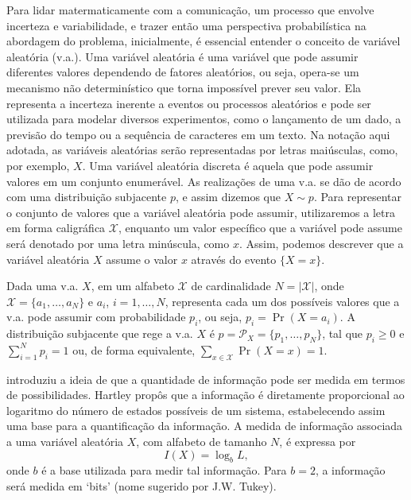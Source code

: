 Para lidar matermaticamente com a comunicação, um processo que envolve
incerteza e variabilidade, e trazer então uma perspectiva probabilística na
abordagem do problema, inicialmente, é essencial entender o conceito de
variável aleatória (v.a.). Uma variável aleatória é uma variável que pode
assumir diferentes valores dependendo de fatores aleatórios, ou seja, opera-se
um mecanismo não determinístico que torna impossível prever seu valor. Ela
representa a incerteza inerente a eventos ou processos aleatórios e pode ser
utilizada para modelar diversos experimentos, como o lançamento de um dado, a
previsão do tempo ou a sequência de caracteres em um texto. Na notação aqui
adotada, as variáveis aleatórias serão representadas por letras maiúsculas,
como, por exemplo, $X$. Uma variável aleatória discreta é aquela que pode
assumir valores em um conjunto enumerável. As realizações de uma v.a. se dão de
acordo com uma distribuição subjacente $p$, e assim dizemos que $X \sim p$.
Para representar o conjunto de valores que a variável aleatória pode assumir,
utilizaremos a letra em forma caligráfica $\mathcal{X}$, enquanto um valor
específico que a variável pode assume será denotado por uma letra minúscula,
como $x$. Assim, podemos descrever que a variável aleatória $X$ assume o valor
$x$ através do evento $\{X=x\}$. 

Dada uma v.a. $X$, em um alfabeto $\mathcal{X}$ de cardinalidade $N = \vert\mathcal{X}\vert$,
onde $\mathcal{X} = \{a_1,\ldots,a_N\}$ e $a_i$, $i=1,\ldots,N$, representa
cada um dos possíveis valores que a v.a. pode assumir com probabilidade $p_i$, ou seja,
$p_i = \Pr(X=a_i)$. A distribuição subjacente que rege a v.a. $X$ é
$p = \mathcal{P}_X = \{p_1, \ldots, p_N\}$, tal que $p_i \geq 0$ e $\sum_{i=1}^N p_i = 1$ ou,
de forma equivalente, $\sum_{x \in \mathcal{X}} \Pr(X=x) = 1$.


\textcite{hartley1928} introduziu a ideia de que a quantidade de informação pode
ser medida em termos de possibilidades. Hartley propôs que a informação é
diretamente proporcional ao logaritmo do número de estados possíveis de um
sistema, estabelecendo assim uma base para a quantificação da informação. A
medida de informação associada a uma variável aleatória $X$, com alfabeto de
tamanho $N$, é expressa por
%
\begin{equation}\label{eq-hartley}
I(X) = \log_b L ,
\end{equation}
%
onde $b$ é a base utilizada para medir tal informação. Para $b=2$, a informação
será medida em `bits' (nome sugerido por J.W. Tukey).

